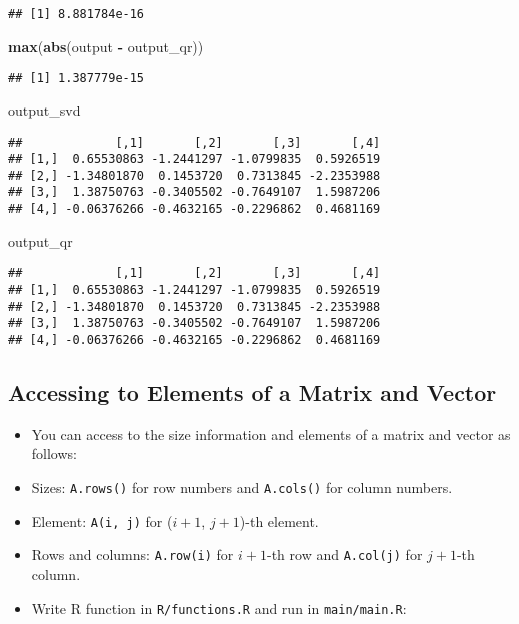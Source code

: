 \documentclass[
]{book}
\newenvironment{Shaded}{\begin{snugshade}}{\end{snugshade}}
\newcommand{\FunctionTok}[1]{\textcolor[rgb]{0.13,0.29,0.53}{\textbf{#1}}}
\newcommand{\NormalTok}[1]{#1}
\newcommand{\SpecialCharTok}[1]{\textcolor[rgb]{0.81,0.36,0.00}{\textbf{#1}}}
\begin{document}
\begin{verbatim}
## [1] 8.881784e-16
\end{verbatim}

\begin{Shaded}
\begin{Highlighting}[]
\FunctionTok{max}\NormalTok{(}\FunctionTok{abs}\NormalTok{(output }\SpecialCharTok{{-}}\NormalTok{ output\_qr))}
\end{Highlighting}
\end{Shaded}

\begin{verbatim}
## [1] 1.387779e-15
\end{verbatim}

\begin{Shaded}
\begin{Highlighting}[]
\NormalTok{output\_svd}
\end{Highlighting}
\end{Shaded}

\begin{verbatim}
##             [,1]       [,2]       [,3]       [,4]
## [1,]  0.65530863 -1.2441297 -1.0799835  0.5926519
## [2,] -1.34801870  0.1453720  0.7313845 -2.2353988
## [3,]  1.38750763 -0.3405502 -0.7649107  1.5987206
## [4,] -0.06376266 -0.4632165 -0.2296862  0.4681169
\end{verbatim}

\begin{Shaded}
\begin{Highlighting}[]
\NormalTok{output\_qr}
\end{Highlighting}
\end{Shaded}

\begin{verbatim}
##             [,1]       [,2]       [,3]       [,4]
## [1,]  0.65530863 -1.2441297 -1.0799835  0.5926519
## [2,] -1.34801870  0.1453720  0.7313845 -2.2353988
## [3,]  1.38750763 -0.3405502 -0.7649107  1.5987206
## [4,] -0.06376266 -0.4632165 -0.2296862  0.4681169
\end{verbatim}

\hypertarget{accessing-to-elements-of-a-matrix-and-vector}{%
\subsection{Accessing to Elements of a Matrix and Vector}\label{accessing-to-elements-of-a-matrix-and-vector}}

\begin{itemize}
\item
  You can access to the size information and elements of a matrix and vector as follows:
\item
  Sizes: \texttt{A.rows()} for row numbers and \texttt{A.cols()} for column numbers.
\item
  Element: \texttt{A(i,\ j)} for (\(i + 1\), \(j + 1\))-th element.
\item
  Rows and columns: \texttt{A.row(i)} for \(i + 1\)-th row and \texttt{A.col(j)} for \(j + 1\)-th column.
\item
  Write R function in \texttt{R/functions.R} and run in \texttt{main/main.R}:
\end{itemize}
\end{document}
